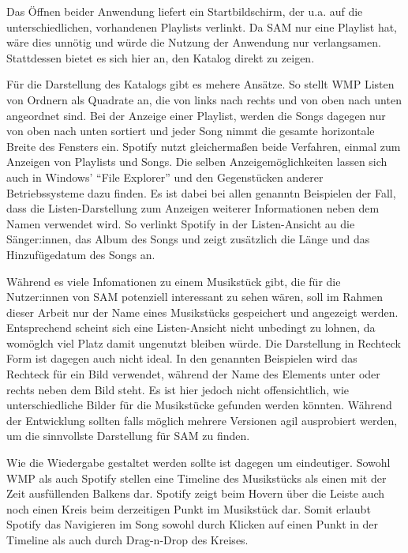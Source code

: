 Das Öffnen beider Anwendung liefert ein Startbildschirm, der u.a. auf die unterschiedlichen, vorhandenen Playlists verlinkt.
Da \ac{SAM} nur eine Playlist hat, wäre dies unnötig und würde die Nutzung der Anwendung nur verlangsamen.
Stattdessen bietet es sich hier an, den Katalog direkt zu zeigen.

Für die Darstellung des Katalogs gibt es mehere Ansätze.
So stellt \ac{WMP} Listen von Ordnern als Quadrate an, die von links nach rechts und von oben nach unten angeordnet sind.
Bei der Anzeige einer Playlist, werden die Songs dagegen nur von oben nach unten sortiert und jeder Song nimmt die gesamte horizontale Breite des Fensters ein.
Spotify nutzt gleichermaßen beide Verfahren, einmal zum Anzeigen von Playlists und Songs.
Die selben Anzeigemöglichkeiten lassen sich auch in Windows' \enquote{File Explorer} und den Gegenstücken anderer Betriebssysteme dazu finden.
Es ist dabei bei allen genanntn Beispielen der Fall, dass die Listen-Darstellung zum Anzeigen weiterer Informationen neben dem Namen verwendet wird.
So verlinkt Spotify in der Listen-Ansicht au die Sänger:innen, das Album des Songs und zeigt zusätzlich die Länge und das Hinzufügedatum des Songs an.

Während es viele Infomationen zu einem Musikstück gibt, die für die Nutzer:innen von \ac{SAM} potenziell interessant zu sehen wären, soll im Rahmen dieser Arbeit nur der Name eines Musikstücks gespeichert und angezeigt werden.
Entsprechend scheint sich eine Listen-Ansicht nicht unbedingt zu lohnen, da womöglch viel Platz damit ungenutzt bleiben würde.
Die Darstellung in Rechteck Form ist dagegen auch nicht ideal.
In den genannten Beispielen wird das Rechteck für ein Bild verwendet, während der Name des Elements unter oder rechts neben dem Bild steht.
Es ist hier jedoch nicht offensichtlich, wie unterschiedliche Bilder für die Musikstücke gefunden werden könnten.
Während der Entwicklung sollten falls möglich mehrere Versionen agil ausprobiert werden, um die sinnvollste Darstellung für \ac{SAM} zu finden.


Wie die Wiedergabe gestaltet werden sollte ist dagegen um eindeutiger.
Sowohl \ac{WMP} als auch Spotify stellen eine Timeline des Musikstücks als einen mit der Zeit ausfüllenden Balkens dar.
Spotify zeigt beim Hovern über die Leiste auch noch einen Kreis beim derzeitigen Punkt im Musikstück dar.
Somit erlaubt Spotify das Navigieren im Song sowohl durch Klicken auf einen Punkt in der Timeline als auch durch Drag-n-Drop des Kreises.

